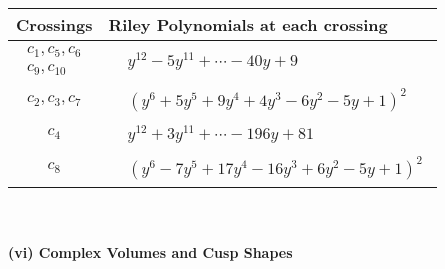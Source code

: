 \documentclass[1p]{elsarticle_modified}
\theoremstyle{definition}
\begin{document}
\begin{tabular}{m{50pt}|m{274pt}}
Crossings & \hspace{64pt}Riley Polynomials at each crossing \\
\hline $$\begin{aligned}c_{1},c_{5},c_{6}\\c_{9},c_{10}\end{aligned}$$&$\begin{aligned}
&y^{12}-5 y^{11}+\cdots-40 y+9
\end{aligned}$\\
\hline $$\begin{aligned}c_{2},c_{3},c_{7}\end{aligned}$$&$\begin{aligned}
&(y^6+5 y^5+9 y^4+4 y^3-6 y^2-5 y+1)^2
\end{aligned}$\\
\hline $$\begin{aligned}c_{4}\end{aligned}$$&$\begin{aligned}
&y^{12}+3 y^{11}+\cdots-196 y+81
\end{aligned}$\\
\hline $$\begin{aligned}c_{8}\end{aligned}$$&$\begin{aligned}
&(y^6-7 y^5+17 y^4-16 y^3+6 y^2-5 y+1)^2
\end{aligned}$\\
\hline
\end{tabular}\\~\\
\newpage\flushleft \textbf{(vi) Complex Volumes and Cusp Shapes}
\end{document}
